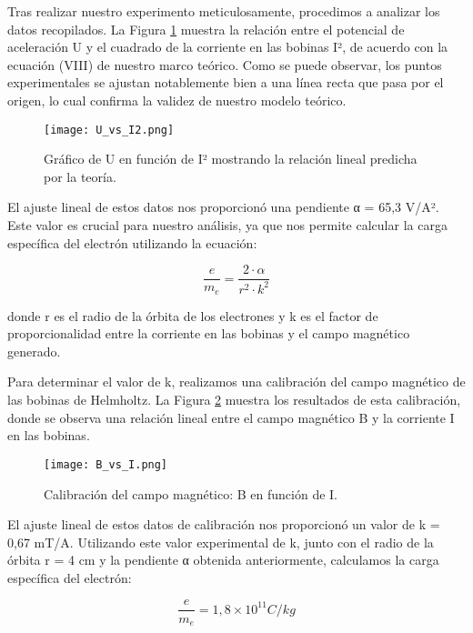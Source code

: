 \documentclass[twocolumn,a4paper,11pt]{scrartcl}
\begin{document}
Tras realizar nuestro experimento meticulosamente, procedimos a analizar los datos recopilados. La Figura \ref{fig:U_vs_I2} muestra la relación entre el potencial de aceleración U y el cuadrado de la corriente en las bobinas I², de acuerdo con la ecuación (VIII) de nuestro marco teórico. Como se puede observar, los puntos experimentales se ajustan notablemente bien a una línea recta que pasa por el origen, lo cual confirma la validez de nuestro modelo teórico.

\begin{figure}[h]
    \centering
    \texttt{[image: U\_vs\_I2.png]}
    \caption{Gráfico de U en función de I² mostrando la relación lineal predicha por la teoría.}
    \label{fig:U_vs_I2}
\end{figure}

El ajuste lineal de estos datos nos proporcionó una pendiente α = 65,3 V/A². Este valor es crucial para nuestro análisis, ya que nos permite calcular la carga específica del electrón utilizando la ecuación:

\begin{equation}
\frac{e}{m_e} = \frac{2 \cdot \alpha}{r^2 \cdot k^2}
\end{equation}

donde r es el radio de la órbita de los electrones y k es el factor de proporcionalidad entre la corriente en las bobinas y el campo magnético generado.

Para determinar el valor de k, realizamos una calibración del campo magnético de las bobinas de Helmholtz. La Figura \ref{fig:B_vs_I} muestra los resultados de esta calibración, donde se observa una relación lineal entre el campo magnético B y la corriente I en las bobinas.

\begin{figure}[h]
    \centering
    \texttt{[image: B\_vs\_I.png]}
    \caption{Calibración del campo magnético: B en función de I.}
    \label{fig:B_vs_I}
\end{figure}

El ajuste lineal de estos datos de calibración nos proporcionó un valor de k = 0,67 mT/A. Utilizando este valor experimental de k, junto con el radio de la órbita r = 4 cm y la pendiente α obtenida anteriormente, calculamos la carga específica del electrón:

\begin{equation}
\frac{e}{m_e} = 1,8 \times 10^{11} C/kg
\end{equation}
\end{document}
